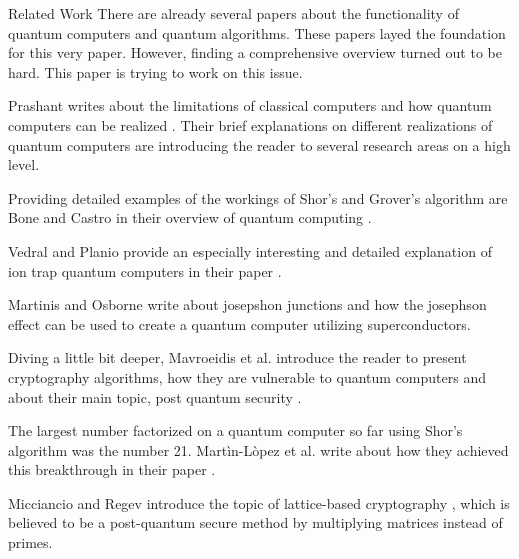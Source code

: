 \documentclass[aps,preprintnumbers,twocolumn]{revtex4}
\begin{document}
\begin{section}{Related Work}
There are already several papers about the functionality of quantum computers and quantum algorithms. These papers layed the foundation for this very paper. 
However, finding a comprehensive overview turned out to be hard. This paper is trying to work on this issue.

Prashant writes about the limitations of classical computers and how quantum computers can be realized \cite{prashant}. 
Their brief explanations on different realizations of quantum computers are introducing the reader to several research areas on a high level. 

Providing detailed examples of the workings of Shor's and Grover's algorithm are Bone and Castro in their overview of quantum computing \cite{Bone}. 

Vedral and Planio provide an especially interesting and detailed explanation of ion trap quantum computers in their paper \cite{2008}.

Martinis and Osborne write about josepshon junctions \cite{martinis} and how the josephson effect can be used to create a quantum computer utilizing superconductors.

Diving a little bit deeper, Mavroeidis et al. introduce the reader to present cryptography algorithms, how they are vulnerable to quantum computers and about their main topic, post quantum security \cite{DBLP:journals/corr/abs-1804-00200}. 

The largest number factorized on a quantum computer so far using Shor's algorithm was the number 21. Martìn-Lòpez et al. write about how they achieved this breakthrough in their paper \cite{article}.

Micciancio and Regev introduce the topic of lattice-based cryptography \cite{Micciancio2009}, which is believed to be a post-quantum secure method by multiplying matrices instead of primes.

\end{section}
\end{document}

